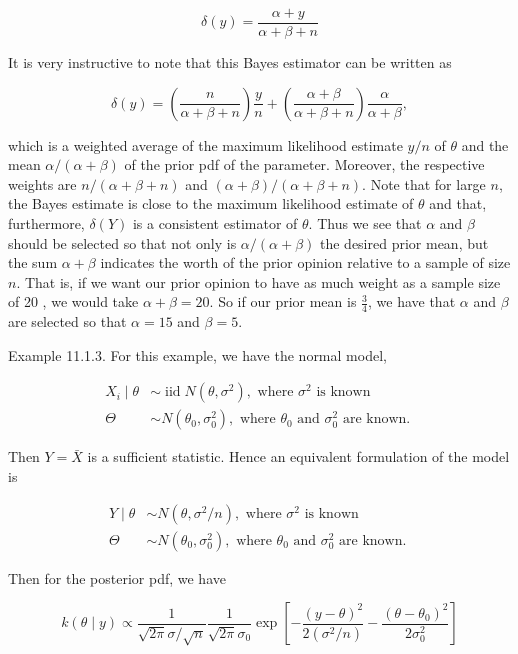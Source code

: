 $$
\delta(y)=\frac{\alpha+y}{\alpha+\beta+n}
$$

It is very instructive to note that this Bayes estimator can be written as

$$
\delta(y)=\left(\frac{n}{\alpha+\beta+n}\right) \frac{y}{n}+\left(\frac{\alpha+\beta}{\alpha+\beta+n}\right) \frac{\alpha}{\alpha+\beta},
$$

which is a weighted average of the maximum likelihood estimate $y / n$ of $\theta$ and the mean $\alpha /(\alpha+\beta)$ of the prior pdf of the parameter. Moreover, the respective weights are $n /(\alpha+\beta+n)$ and $(\alpha+\beta) /(\alpha+\beta+n)$. Note that for large $n$, the Bayes estimate is close to the maximum likelihood estimate of $\theta$ and that, furthermore, $\delta(Y)$ is a consistent estimator of $\theta$. Thus we see that $\alpha$ and $\beta$ should be selected so that not only is $\alpha /(\alpha+\beta)$ the desired prior mean, but the sum $\alpha+\beta$ indicates the worth of the prior opinion relative to a sample of size $n$. That is, if we want our prior opinion to have as much weight as a sample size of 20 , we would take $\alpha+\beta=20$. So if our prior mean is $\frac{3}{4}$, we have that $\alpha$ and $\beta$ are selected so that $\alpha=15$ and $\beta=5$.

Example 11.1.3. For this example, we have the normal model,

$$
\begin{aligned}
X_{i} \mid \theta & \sim \operatorname{iid} N\left(\theta, \sigma^{2}\right), \text { where } \sigma^{2} \text { is known } \\
\Theta & \sim N\left(\theta_{0}, \sigma_{0}^{2}\right), \text { where } \theta_{0} \text { and } \sigma_{0}^{2} \text { are known. }
\end{aligned}
$$

Then $Y=\bar{X}$ is a sufficient statistic. Hence an equivalent formulation of the model is

$$
\begin{aligned}
Y \mid \theta & \sim N\left(\theta, \sigma^{2} / n\right), \text { where } \sigma^{2} \text { is known } \\
\Theta & \sim N\left(\theta_{0}, \sigma_{0}^{2}\right), \text { where } \theta_{0} \text { and } \sigma_{0}^{2} \text { are known. }
\end{aligned}
$$

Then for the posterior pdf, we have

$$
k(\theta \mid y) \propto \frac{1}{\sqrt{2 \pi} \sigma / \sqrt{n}} \frac{1}{\sqrt{2 \pi} \sigma_{0}} \exp \left[-\frac{(y-\theta)^{2}}{2\left(\sigma^{2} / n\right)}-\frac{\left(\theta-\theta_{0}\right)^{2}}{2 \sigma_{0}^{2}}\right]
$$

